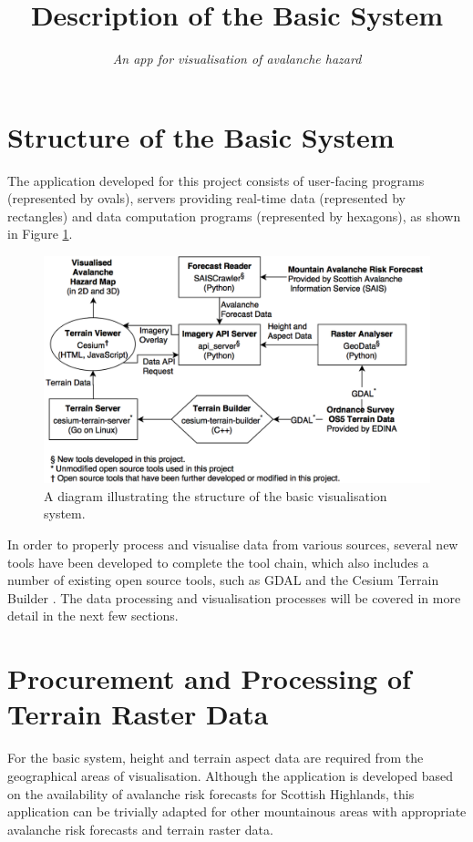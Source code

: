 \documentclass[11pt, oneside]{article}
\title{\vspace{-1.6cm}Description of the Basic System}
\author{\textit{An app for visualisation of avalanche hazard}}
\date{}
\begin{document}
\maketitle

\section{Structure of the Basic System}

The application developed for this project consists of user-facing programs (represented by ovals), servers providing real-time data (represented by rectangles) and data computation programs (represented by hexagons), as shown in Figure \ref{fig:systemstructure}.

\begin{figure}[h]
\label{fig:systemstructure}
\centering
\includegraphics[scale=0.3]{System.png}
\caption{A diagram illustrating the structure of the basic visualisation system.}
\end{figure}

In order to properly process and visualise data from various sources, several new tools have been developed to complete the tool chain, which also includes a number of existing open source tools, such as GDAL\cite{GDAL} and the Cesium Terrain Builder \cite{cesium-terrain-builder}. The data processing and visualisation processes will be covered in more detail in the next few sections.

\section{Procurement and Processing of Terrain Raster Data}
	For the basic system, height and terrain aspect data are required from the geographical areas of visualisation. Although the application is developed based on the availability of avalanche risk forecasts for Scottish Highlands, this application can be trivially adapted for other mountainous areas with appropriate avalanche risk forecasts and terrain raster data.
	
\end{document}
